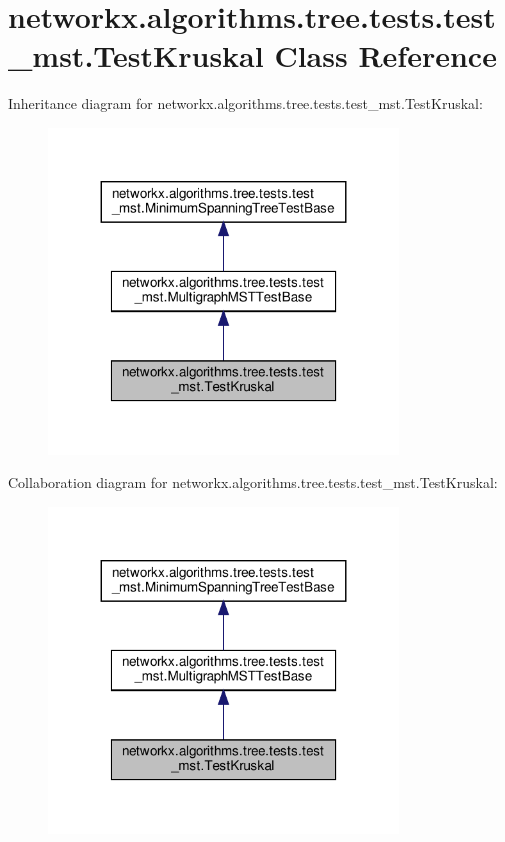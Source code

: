 \hypertarget{classnetworkx_1_1algorithms_1_1tree_1_1tests_1_1test__mst_1_1TestKruskal}{}\section{networkx.\+algorithms.\+tree.\+tests.\+test\+\_\+mst.\+Test\+Kruskal Class Reference}
\label{classnetworkx_1_1algorithms_1_1tree_1_1tests_1_1test__mst_1_1TestKruskal}


Inheritance diagram for networkx.\+algorithms.\+tree.\+tests.\+test\+\_\+mst.\+Test\+Kruskal\+:
\nopagebreak
\begin{figure}[H]
\begin{center}
\leavevmode
\includegraphics[width=263pt]{classnetworkx_1_1algorithms_1_1tree_1_1tests_1_1test__mst_1_1TestKruskal__inherit__graph}
\end{center}
\end{figure}


Collaboration diagram for networkx.\+algorithms.\+tree.\+tests.\+test\+\_\+mst.\+Test\+Kruskal\+:
\nopagebreak
\begin{figure}[H]
\begin{center}
\leavevmode
\includegraphics[width=263pt]{classnetworkx_1_1algorithms_1_1tree_1_1tests_1_1test__mst_1_1TestKruskal__coll__graph}
\end{center}
\end{figure}
